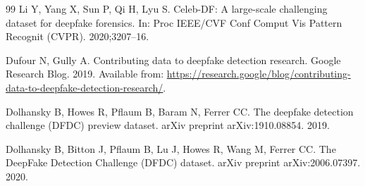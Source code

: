 \documentclass[fonts]{icst}
\begin{document}
\begin{thebibliography}{99}
Li Y, Yang X, Sun P, Qi H, Lyu S.
Celeb-DF: A large-scale challenging dataset for deepfake forensics.
In: Proc IEEE/CVF Conf Comput Vis Pattern Recognit (CVPR). 2020;3207--16.

Dufour N, Gully A.
Contributing data to deepfake detection research.
Google Research Blog. 2019. Available from: \url{https://research.google/blog/contributing-data-to-deepfake-detection-research/}.

Dolhansky B, Howes R, Pflaum B, Baram N, Ferrer CC.
The deepfake detection challenge (DFDC) preview dataset.
arXiv preprint arXiv:1910.08854. 2019.

Dolhansky B, Bitton J, Pflaum B, Lu J, Howes R, Wang M, Ferrer CC.
The DeepFake Detection Challenge (DFDC) dataset.
arXiv preprint arXiv:2006.07397. 2020.

\end{thebibliography}
\end{document}
